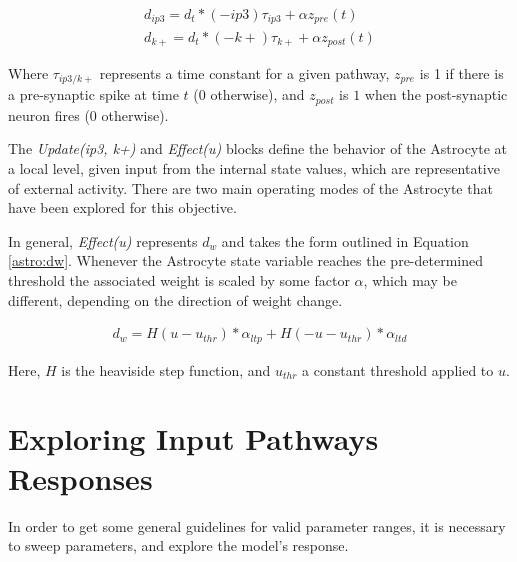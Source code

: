     \begin{align}
      d_{ip3} = d_t * (-ip3)\tau_{ip3} + \alpha z_{pre}(t) \label{eq:astro:spike-ip3} \\
      d_{k+} = d_t * (-k+)\tau_{k+} + \alpha z_{post}(t) \label{eq:astro:spike-k+}
    \end{align}

    Where $\tau_{ip3/k+}$ represents a time constant for a given pathway, $z_{pre}$ is
    1 if there is a pre-synaptic spike at time $t$ ($0$ otherwise), and
    $z_{post}$ is $1$ when the post-synaptic neuron fires ($0$
    otherwise).

    The \emph{Update(ip3, k+)} and \emph{Effect(u)} blocks define the behavior
    of the Astrocyte at a local level, given input from the internal state
    values, which are representative of external activity. There are two main
    operating modes of the Astrocyte that have been explored for this objective.

    In general, \emph{Effect(u)} represents $d_w$ and takes the form outlined in
    Equation \ref{astro:dw}. Whenever the Astrocyte state variable reaches the
    pre-determined threshold the associated weight is scaled by some factor
    $\alpha$, which may be different, depending on the direction of weight
    change.

    \begin{align}
      d_w = H(u - u_{thr}) * \alpha_{ltp} + H(-u - u_{thr}) * \alpha_{ltd} \label{astro:dw}
    \end{align}

    Here, $H$ is the heaviside step function, and $u_{thr}$ a constant threshold
    applied to $u$.
    
    \section{Exploring Input Pathways Responses}

    In order to get some general guidelines for valid parameter ranges, it is
    necessary to sweep parameters, and explore the model's response.
    


